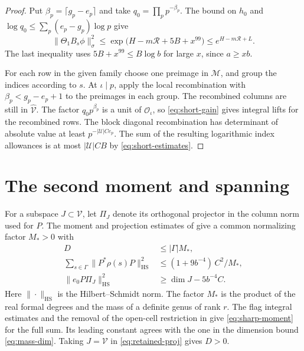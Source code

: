 \documentclass[11pt,reqno]{amsart}
\theoremstyle{definition}
\numberwithin{equation}{section}
\newcommand{\HS}{\mathrm{HS}}
\newcommand{\of}{\mathcal O}
\begin{document}
\begin{proof}
Put \(\beta_p=\lceil g_p-e_p\rceil\) and take
\(q_0=\prod_p p^{-\beta_p}\).
The bound on \(h_0\) and
\(\log q_0\le\sum_p(e_p-g_p)\log p\) give
\[
 \|\Theta_1 B_s\phi\|_\sigma^2
   \le \exp\bigl(H-m\mathcal R+5B+x^{99}\bigr)
   \le e^{H-m\mathcal R+L}.
\]
The last inequality uses \(5B+x^{99}\le B\log b\) for large
\(x\), since \(a\ge xb\).

For each row in the given family choose one preimage in
\(\mathcal M\), and group the indices according to \(s\).
At \(\iota\mid p\), apply the local recombination with
\(\beta_p<g_p-e_p+1\) to the preimages in each group. The
recombined columns are still in \(\widehat{\mathcal V}\).
The factor \(q_0p^{\beta_p}\) is a unit of \(\of_\iota\),
so \eqref{eq:short-gain} gives integral lifts for the
recombined rows. The block diagonal recombination has
determinant of absolute value at least \(p^{-|\mathcal U|Ce_p}\).
The sum of the resulting logarithmic index allowances is
at most \(|\mathcal U|CB\) by \eqref{eq:short-estimates}.
\end{proof}




\section{The second moment and spanning}\label{sec:span}

For a subspace \(J\subset\mathcal V\), let \(\Pi_J\) denote its
orthogonal projector in the column norm used for \(P\).
The moment and projection estimates of
\cite[{\rm(11.13), (11.14), (11.18)}]{chojecki} give a common
normalizing factor \(M_*>0\) with
\begin{align}
 D&\le |\Gamma|M_* ,\label{eq:mass-dim}\\
 \sum_{s\in\Gamma}\|P^*\rho(s)P\|_{\HS}^2
      &\le (1+9b^{-4})\, C^2/M_* ,\label{eq:sharp-moment}\\
 \|e_0P\Pi_J\|_{\HS}^2
      &\ge \dim J-5b^{-4}C .\label{eq:retained-proj}
\end{align}
Here \(\|\cdot\|_{\HS}\) is the Hilbert--Schmidt norm.
The factor \(M_*\) is the product of the real formal degrees
and the mass of a definite genus of rank \(r\).
The flag integral estimates and the removal of the open-cell
restriction in \cite[Propositions~10.11 and~11.11]{chojecki}
give \eqref{eq:sharp-moment} for the full sum. Its leading
constant agrees with the one in the dimension bound
\eqref{eq:mass-dim}. Taking \(J=\mathcal V\) in
\eqref{eq:retained-proj} gives \(D>0\).
\end{document}
